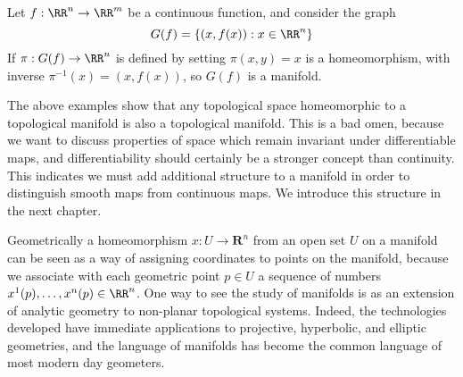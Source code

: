 \begin{example}
    Let $f: \RR^n \to \RR^m$ be a continuous function, and consider the graph
    \[ G(f) = \{ (x, f(x)) : x \in \RR^n \} \]
    If $\pi: G(f) \to \RR^n$ is defined by setting $\pi(x,y) = x$ is a homeomorphism, with inverse $\pi^{-1}(x) = (x,f(x))$, so $G(f)$ is a manifold.
\end{example}




\begin{remark}
    The above examples show that any topological space homeomorphic to a topological manifold is also a topological manifold. This is a bad omen, because we want to discuss properties of space which remain invariant under differentiable maps, and differentiability should certainly be a stronger concept than continuity. This indicates we must add additional structure to a manifold in order to distinguish smooth maps from continuous maps. We introduce this structure in the next chapter.
\end{remark}

Geometrically a homeomorphism $x: U \to \mathbf{R}^n$ from an open set $U$ on a manifold can be seen as a way of assigning coordinates to points on the manifold, because we associate with each geometric point $p \in U$ a sequence of numbers $x^1(p), \dots, x^n(p) \in \RR^n$. One way to see the study of manifolds is as an extension of analytic geometry to non-planar topological systems. Indeed, the technologies developed have immediate applications to projective, hyperbolic, and elliptic geometries, and the language of manifolds has become the common language of most modern day geometers.

